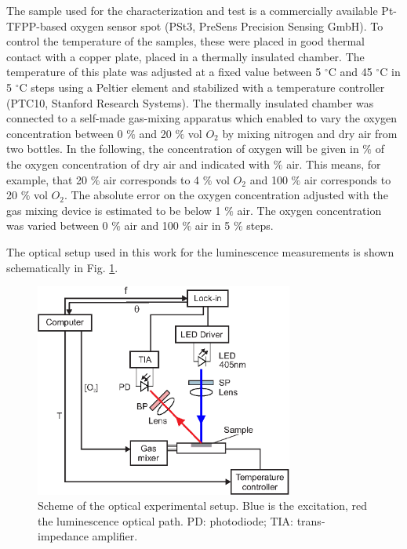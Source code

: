 \documentclass[9pt,twocolumn,twoside,pdftex]{optica}
\begin{document}
The sample used for the characterization and test is a commercially available Pt-TFPP-based oxygen sensor spot (PSt3, PreSens Precision Sensing GmbH).
To control the temperature of the samples, these were placed in good thermal contact with a copper plate, placed in a thermally insulated chamber. The temperature of this plate was adjusted at a fixed value between 5 $^\circ$C and 45 $^\circ$C in 5 $^\circ$C steps using a Peltier element and stabilized with a temperature controller (PTC10, Stanford Research Systems). The thermally insulated chamber was connected to a self-made gas-mixing apparatus which enabled to vary the oxygen concentration between 0 $\%$ and 20 $\%$ vol $O_2$ by mixing nitrogen and dry air from two bottles. In the following, the concentration of oxygen will be given in $\%$ of the oxygen concentration of dry air and indicated with $\%$ air. This means, for example, that 20 $\%$ air corresponds to 4 $\%$ vol $O_2$ and 100 $\%$ air corresponds to 20 $\%$ vol $O_2$. The absolute error on the oxygen concentration adjusted with the gas mixing device is estimated to be below 1 $\%$ air. The oxygen concentration was varied between 0 $\%$ air and 100 $\%$ air in 5 $\%$ steps.
 
The optical setup used in this work for the luminescence measurements is shown schematically in Fig. \ref{fig:setup}.

\begin{figure}[htbp]
\centering
\includegraphics[keepaspectratio, width=8.5cm]{setup_auto.eps}
\caption{Scheme of the optical experimental setup. Blue is the excitation, red the luminescence optical path. PD: photodiode; TIA: trans-impedance amplifier.}
\label{fig:setup}
\end{figure}
\end{document}
